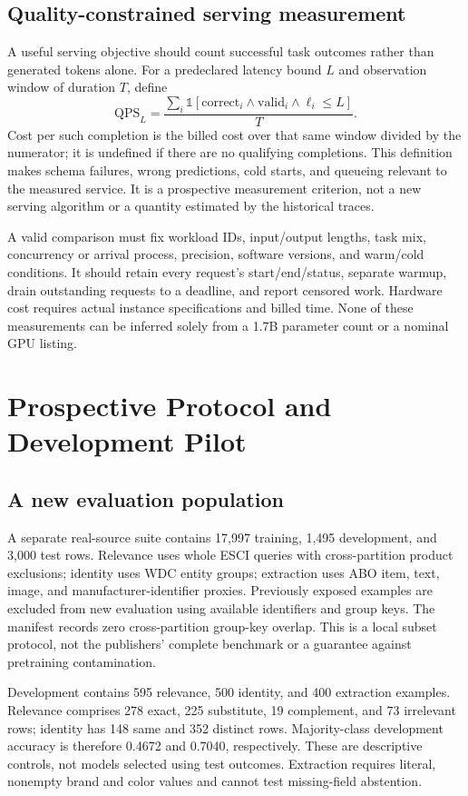 \subsection{Quality-constrained serving measurement}
A useful serving objective should count successful task outcomes rather than generated tokens alone. For a predeclared latency bound $L$ and observation window of duration $T$, define
\begin{equation}
\mathrm{QPS}_{L}=\frac{\sum_i\mathbb{1}[\text{correct}_i\land\text{valid}_i\land\ell_i\leq L]}{T}.
\end{equation}
Cost per such completion is the billed cost over that same window divided by the numerator; it is undefined if there are no qualifying completions. This definition makes schema failures, wrong predictions, cold starts, and queueing relevant to the measured service. It is a prospective measurement criterion, not a new serving algorithm or a quantity estimated by the historical traces.

A valid comparison must fix workload IDs, input/output lengths, task mix, concurrency or arrival process, precision, software versions, and warm/cold conditions. It should retain every request's start/end/status, separate warmup, drain outstanding requests to a deadline, and report censored work. Hardware cost requires actual instance specifications and billed time. None of these measurements can be inferred solely from a 1.7B parameter count or a nominal GPU listing.


\section{Prospective Protocol and Development Pilot}
\subsection{A new evaluation population}
A separate real-source suite contains 17,997 training, 1,495 development, and 3,000 test rows. Relevance uses whole ESCI queries with cross-partition product exclusions; identity uses WDC entity groups; extraction uses ABO item, text, image, and manufacturer-identifier proxies. Previously exposed examples are excluded from new evaluation using available identifiers and group keys. The manifest records zero cross-partition group-key overlap. This is a local subset protocol, not the publishers' complete benchmark or a guarantee against pretraining contamination.

Development contains 595 relevance, 500 identity, and 400 extraction examples. Relevance comprises 278 exact, 225 substitute, 19 complement, and 73 irrelevant rows; identity has 148 same and 352 distinct rows. Majority-class development accuracy is therefore 0.4672 and 0.7040, respectively. These are descriptive controls, not models selected using test outcomes. Extraction requires literal, nonempty brand and color values and cannot test missing-field abstention.

